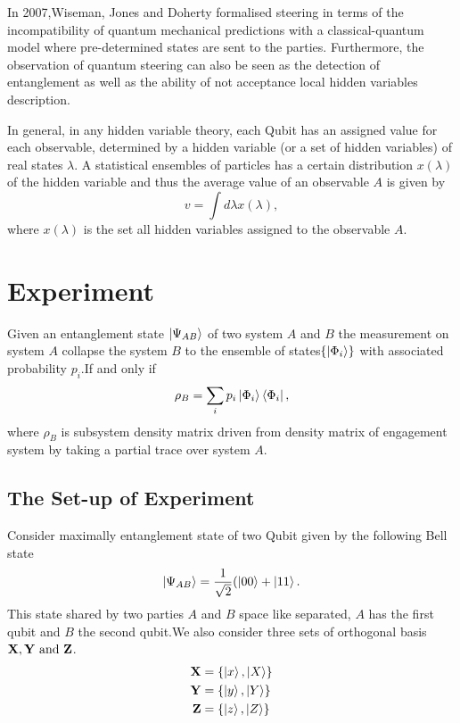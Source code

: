  In 2007,Wiseman, Jones and Doherty formalised steering in terms of the incompatibility of quantum mechanical predictions with a classical-quantum model where pre-determined states are sent to the parties. Furthermore, the observation of quantum steering can also be seen as the detection of entanglement as well as the ability of not acceptance local hidden variables description\cite{Jevtic:2015:10.1364/JOSAB.32.000A50}.


In general, in any hidden variable theory, each Qubit has an assigned value for each observable, determined by a hidden variable (or a set of hidden variables) of real
states $\lambda$. A statistical ensembles of particles has a certain distribution $x(\lambda)$ of the hidden variable and thus the average value of an observable $A$ is given by
\begin{equation}
v=\int d \lambda x(\lambda),
\end{equation}
where $x(\lambda)$ is the set all hidden variables assigned to the observable $A$.


\section{Experiment}\hfill \break
\begin{theorem}
Given an entanglement state $\ket{\Psi_{AB}}$ of two system $A$ and $B$ the measurement on system $A$ collapse the system $B$ to the ensemble of states$\{\ket{\Phi_i}\}$ with associated probability $p_i$.If and only if 
\begin{equation}
\rho_B=\sum_i p_i \ket{\Phi_i} \bra{\Phi_i},
\end{equation}
where $\rho_B$ is subsystem density matrix driven from density matrix of engagement system by taking a partial trace over  system $A$.
\end{theorem}

\subsection{The Set-up of Experiment}\hfill \break
Consider maximally entanglement  state of two Qubit given by the following Bell state
\begin{align*}
\ket{\Psi_{AB}}=\frac{1}{\sqrt{2}}(\ket{00}+\ket{11}.
\end{align*}
This state shared by two parties $A$ and $B$ space like separated, $A$ has the first qubit and $B$ the second qubit.We also consider  three sets of orthogonal basis $\bf{X}, \bf{Y} \text{ and } \bf{Z}$.
\begin{align}
 \bf{X}&=\{\ket{x},\ket{X}\}\\
 \bf{Y}&=\{\ket{y},\ket{Y}\}\\
  \bf{Z}&=\{\ket{z},\ket{Z}\}
\end{align}


